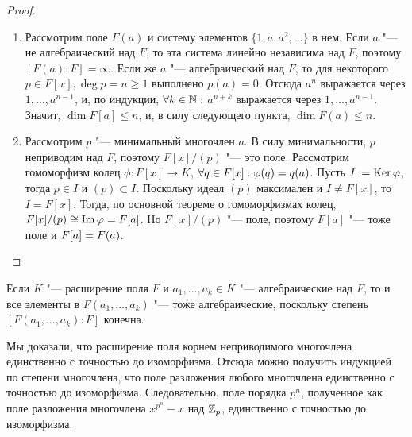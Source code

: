 \begin{proof}~
	\begin{enumerate}
		\item Рассмотрим поле $F(a)$ и систему элементов $\{1, a, a^2, \dotsc\}$ в нем. Если $a$ "--- не алгебраический над $F$, то эта система линейно независима над $F$, поэтому $[F(a) : F] = \infty$. Если же $a$ "--- алгебраический над $F$, то для некоторого $p \in F[x], \deg{p} = n \ge 1$ выполнено $p(a) = 0$. Отсюда $a^n$ выражается через $1, \dotsc, a^{n-1}$, и, по индукции, $\forall k \in \mathbb{N}:$ $a^{n + k}$ выражается через $1, \dotsc, a^{n-1}$. Значит, $\dim{F[a]} \le n$, и, в силу следующего пункта, $\dim{F(a)} \le n$.
		\item Рассмотрим $p$ "--- минимальный многочлен $a$. В силу минимальности, $p$ неприводим над $F$, поэтому $F[x] / (p)$ "--- это поле. Рассмотрим гомоморфизм колец $\phi: F[x] \to K$, $\forall q \in F[x]: \phi(q) \hm= q(a)$. Пусть $I := \operatorname{Ker}\varphi$, тогда $p \in I$ и $(p) \subset I$. Поскольку идеал $(p)$ максимален и $I \ne F[x]$, то $I = F[x]$. Тогда, по основной теореме о гомоморфизмах колец, $F[x] / (p) \cong \operatorname{Im}\varphi = F[a]$. Но $F[x] / (p)$ "--- поле, поэтому $F[a]$ "--- тоже поле и $F[a] \hm= F(a)$.
	\end{enumerate}
\end{proof}

\begin{corollary}
	Если $K$ "--- расширение поля $F$ и $a_1, \dotsc, a_k \in K$ "--- алгебраические над $F$, то и все элементы в $F(a_1, \dotsc, a_k)$ "--- тоже алгебраические, поскольку степень $[F(a_1, \dotsc, a_k) : F]$ конечна.
\end{corollary}

\begin{note}
	Мы доказали, что расширение поля корнем неприводимого многочлена единственно с точностью до изоморфизма. Отсюда можно получить индукцией по степени многочлена, что поле разложения любого многочлена единственно с точностью до изоморфизма. Следовательно, поле порядка $p^n$, полученное как поле разложения многочлена $x^{p^n} - x$ над $\mathbb{Z}_p$, единственно с точностью до изоморфизма.
\end{note}